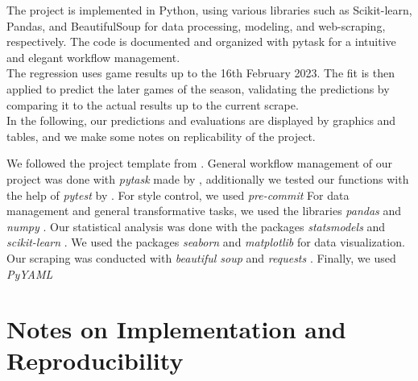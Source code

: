 \documentclass[11pt, a4paper, leqno]{article}
\begin{document}
The project is implemented in Python, using various libraries such as Scikit-learn, Pandas, and BeautifulSoup for data processing, modeling, and web-scraping, respectively.
The code is documented and organized with pytask for a intuitive and elegant workflow management.\\

The regression uses game results up to the 16th February 2023. The fit is then applied to predict the later games of the season, validating the predictions by comparing it to the actual results up to the current scrape.\\
In the following, our predictions and evaluations are displayed by graphics and tables, and we make some notes on replicability of the project.

We followed the project template from \citet{GaudeckerEconProjectTemplates}.
General workflow management of our project was done with \textit{pytask} made by \citet{Raabe2020}, additionally we tested our functions with the help of \textit{pytest} by \citet{pytest7.2.2}. For style control, we used \textit{pre-commit} %
For data management and general transformative tasks, we used the libraries \textit{pandas} \citep{mckinney2010data} and \textit{numpy} \citep{2020NumPy-Array}.
Our statistical analysis was done with the packages \textit{statsmodels} \citep{seabold2010statsmodels} and \textit{scikit-learn} \citep{scikit-learn}.
We used the packages \textit{seaborn} \citep{Waskom2021} and \textit{matplotlib} \citep{Hunter:2007} for data visualization.
Our scraping was conducted with \textit{beautiful soup} \citep{richardson2007beautiful} and \textit{requests} \citep{requests}.
Finally, we used \textit{PyYAML} %



\section{Notes on Implementation and Reproducibility}
\end{document}
